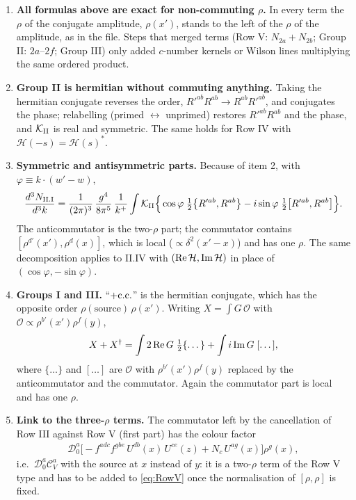 \documentclass[10pt]{article}
\numberwithin{equation}{section}
\begin{document}
\begin{enumerate}
\item \textbf{All formulas above are exact for non-commuting $\rho$.} In every term the $\rho$ of the conjugate amplitude, $\rho(x')$, stands to the left of the $\rho$ of the amplitude, as in the file. Steps that merged terms (Row V: $N_{2a}+N_{2b}$; Group II: $2a$--$2f$; Group III) only added $c$-number kernels or Wilson lines multiplying the same ordered product.
\item \textbf{Group II is hermitian without commuting anything.} Taking the hermitian conjugate reverses the order, $R'^{ab}R^{ab}\to R^{ab}R'^{ab}$, and conjugates the phase; relabelling (primed $\leftrightarrow$ unprimed) restores $R'^{ab}R^{ab}$ and the phase, and $\mathcal{K}_{\rm II}$ is real and symmetric. The same holds for Row IV with $\mathcal{H}(-s)=\mathcal{H}(s)^{*}$.
\item \textbf{Symmetric and antisymmetric parts.} Because of item 2, with $\varphi\equiv k\cdot(w'-w)$,
\begin{align}
\frac{d^{3}N_{\rm II.I}}{d^{3}k}=\frac{1}{(2\pi)^{3}}\,\frac{g^{4}}{8\pi^{5}}\,\frac{1}{k^{+}}\int\mathcal{K}_{\rm II}\Big\{\cos\varphi\;\tfrac12\big\{R'^{ab},R^{ab}\big\}-i\sin\varphi\;\tfrac12\big[R'^{ab},R^{ab}\big]\Big\}.
\end{align}
The anticommutator is the two-$\rho$ part; the commutator contains $[\rho^{d'}(x'),\rho^{d}(x)]$, which is local ($\propto\delta^{2}(x'-x)$) and has one $\rho$. The same decomposition applies to II.IV with $({\rm Re}\,\mathcal{H},{\rm Im}\,\mathcal{H})$ in place of $(\cos\varphi,-\sin\varphi)$.
\item \textbf{Groups I and III.} ``$+{\rm c.c.}$'' is the hermitian conjugate, which has the opposite order $\rho(\text{source})\,\rho(x')$. Writing $X=\int G\,\mathcal{O}$ with $\mathcal{O}\propto\rho^{b'}(x')\rho^{f}(y)$,
\begin{align}
X+X^{\dagger}=\int 2\,{\rm Re}\,G\;\tfrac12\{\dots\}+\int i\,{\rm Im}\,G\;[\dots],
\end{align}
where $\{\dots\}$ and $[\dots]$ are $\mathcal{O}$ with $\rho^{b'}(x')\rho^{f}(y)$ replaced by the anticommutator and the commutator. Again the commutator part is local and has one $\rho$.
\item \textbf{Link to the three-$\rho$ terms.} The commutator left by the cancellation of Row III against Row V (first part) has the colour factor
\begin{align}
\mathcal{D}_{0}^{a}\big[-f^{adc}f^{gbe}\,U^{db}(x)\,U^{ce}(z)+N_{c}\,U^{ag}(x)\big]\rho^{g}(x),
\end{align}
i.e.\ $\mathcal{D}_{0}^{a}\mathcal{C}_{V}^{a}$ with the source at $x$ instead of $y$: it is a two-$\rho$ term of the Row V type and has to be added to \eqref{eq:RowV} once the normalisation of $[\rho,\rho]$ is fixed.
\end{enumerate}
\end{document}
